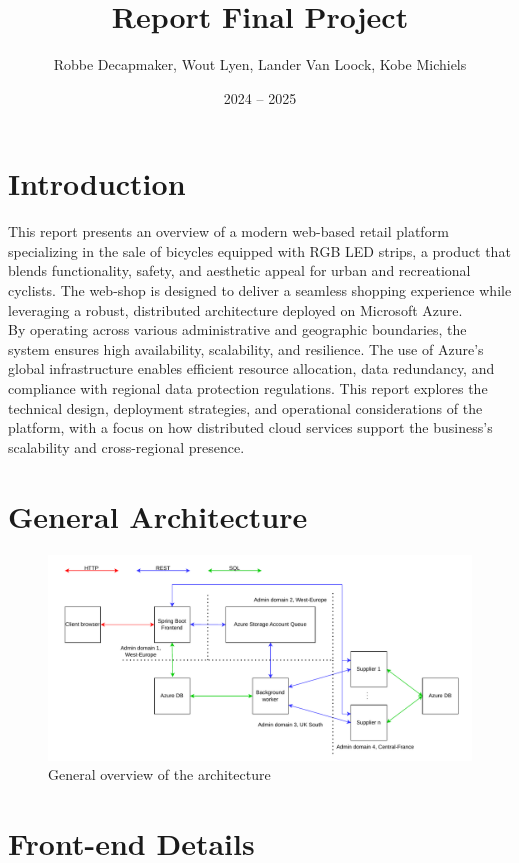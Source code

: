 \documentclass[10pt,a4paper,kul]{kulakarticle} %
\date{2024 -- 2025}
\title{Report Final Project}
\author{Robbe Decapmaker, Wout Lyen, Lander Van Loock, Kobe Michiels}
\begin{document}
	\maketitle  
	\section*{Introduction}
		This report presents an overview of a modern web-based retail platform specializing in the sale of bicycles equipped with RGB LED strips, a product that blends functionality, safety, and aesthetic appeal for urban and recreational cyclists. The web-shop is designed to deliver a seamless shopping experience while leveraging a robust, distributed architecture deployed on Microsoft Azure.\\
		By operating across various administrative and geographic boundaries, the system ensures high availability, scalability, and resilience. The use of Azure’s global infrastructure enables efficient resource allocation, data redundancy, and compliance with regional data protection regulations. This report explores the technical design, deployment strategies, and operational considerations of the platform, with a focus on how distributed cloud services support the business’s scalability and cross-regional presence.

	\section{General Architecture}
		\begin{figure}[h]
			\centering
			\includegraphics[width=1\linewidth]{images/arch}
			\caption{General overview of the architecture}
			\label{fig:arch}
		\end{figure}
		
	
	\section{Front-end Details}
	
\end{document}

